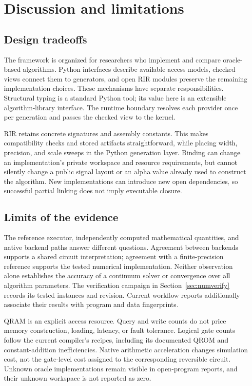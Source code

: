\section{Discussion and limitations}
\label{sec:discussion}

\subsection{Design tradeoffs}
\label{sec:tradeoffs}

The framework is organized for researchers who implement and compare
oracle-based algorithms. Python interfaces describe available access
models, checked views connect them to generators, and open RIR modules
preserve the remaining implementation choices. These mechanisms have
separate responsibilities. Structural typing is a standard Python tool;
its value here is an extensible algorithm-library interface. The runtime
boundary resolves each provider once per generation and passes the
checked view to the kernel.

RIR retains concrete signatures and assembly constants. This makes
compatibility checks and stored artifacts straightforward, while placing
width, precision, and scale sweeps in the Python generation layer.
Binding can change an implementation's private workspace and resource
requirements, but cannot silently change a public signal layout or an
alpha value already used to construct the algorithm. New implementations
can introduce new open dependencies, so successful partial linking does
not imply executable closure.

\subsection{Limits of the evidence}
\label{sec:limitations}

The reference executor, independently computed mathematical quantities,
and native backend paths answer different questions. Agreement between
backends supports a shared circuit interpretation; agreement with a
finite-precision reference supports the tested numerical implementation.
Neither observation alone establishes the accuracy of a continuum
solver or convergence over all algorithm parameters. The verification
campaign in Section~\ref{sec:numverify} records its tested instances and
revision. Current workflow reports additionally associate their results
with program and data fingerprints.

QRAM is an explicit access resource. Query and write counts do not price
memory construction, loading, latency, or fault tolerance. Logical gate
counts follow the current compiler's recipes, including its documented
QROM and constant-addition inefficiencies. Native arithmetic acceleration
changes simulation cost, not the gate-level cost assigned to the
corresponding reversible circuit. Unknown oracle implementations remain
visible in open-program reports, and their unknown workspace is not
reported as zero.

